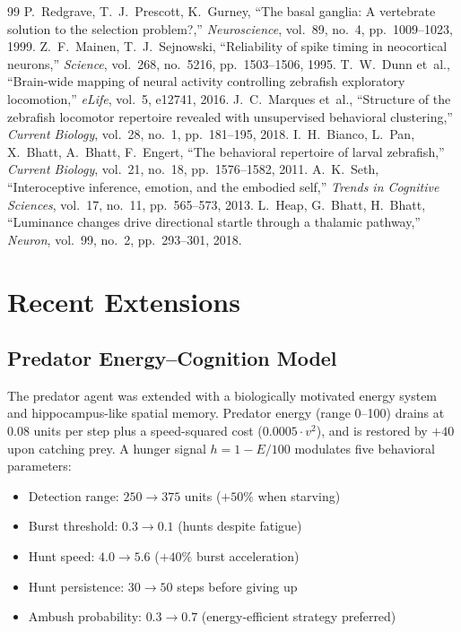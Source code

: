 \documentclass[11pt,a4paper]{article}
\begin{document}
\begin{thebibliography}{99}
  P.~Redgrave, T.~J.~Prescott, K.~Gurney,
  ``The basal ganglia: A vertebrate solution to the selection problem?,''
  \textit{Neuroscience}, vol.~89, no.~4, pp.~1009--1023, 1999.
  Z.~F.~Mainen, T.~J.~Sejnowski,
  ``Reliability of spike timing in neocortical neurons,''
  \textit{Science}, vol.~268, no.~5216, pp.~1503--1506, 1995.
  T.~W.~Dunn et~al.,
  ``Brain-wide mapping of neural activity controlling zebrafish exploratory locomotion,''
  \textit{eLife}, vol.~5, e12741, 2016.
  J.~C.~Marques et~al.,
  ``Structure of the zebrafish locomotor repertoire revealed with unsupervised behavioral clustering,''
  \textit{Current Biology}, vol.~28, no.~1, pp.~181--195, 2018.
  I.~H.~Bianco, L.~Pan, X.~Bhatt, A.~Bhatt, F.~Engert,
  ``The behavioral repertoire of larval zebrafish,''
  \textit{Current Biology}, vol.~21, no.~18, pp.~1576--1582, 2011.
  A.~K.~Seth,
  ``Interoceptive inference, emotion, and the embodied self,''
  \textit{Trends in Cognitive Sciences}, vol.~17, no.~11, pp.~565--573, 2013.
  L.~Heap, G.~Bhatt, H.~Bhatt,
  ``Luminance changes drive directional startle through a thalamic pathway,''
  \textit{Neuron}, vol.~99, no.~2, pp.~293--301, 2018.
\end{thebibliography}

\appendix
\section{Recent Extensions}

\subsection{Predator Energy--Cognition Model}

The predator agent was extended with a biologically motivated energy system and hippocampus-like spatial memory. Predator energy (range 0--100) drains at 0.08 units per step plus a speed-squared cost ($0.0005 \cdot v^2$), and is restored by $+40$ upon catching prey. A hunger signal $h = 1 - E/100$ modulates five behavioral parameters:
\begin{itemize}
\item Detection range: $250 \to 375$ units ($+50\%$ when starving)
\item Burst threshold: $0.3 \to 0.1$ (hunts despite fatigue)
\item Hunt speed: $4.0 \to 5.6$ ($+40\%$ burst acceleration)
\item Hunt persistence: $30 \to 50$ steps before giving up
\item Ambush probability: $0.3 \to 0.7$ (energy-efficient strategy preferred)
\end{itemize}
\end{document}
